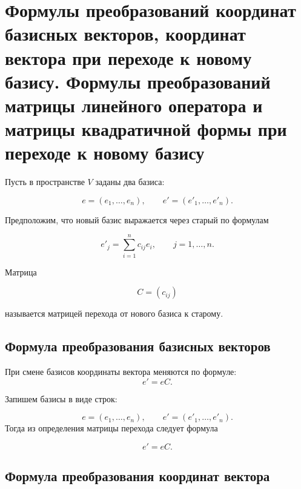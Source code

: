 \documentclass[14pt]{extreport}
\begin{document}
    \chapter{Формулы преобразований координат базисных векторов, координат вектора при переходе к новому базису. Формулы преобразований матрицы линейного оператора и
матрицы квадратичной формы при переходе к новому базису}

\begin{defbox}
    Пусть в пространстве \(V\) заданы два базиса:

\[
e=(e_1,\ldots,e_n),
\qquad
e'=(e'_1,\ldots,e'_n).
\]

Предположим, что новый базис выражается через старый по формулам

\[
e'_j=\sum_{i=1}^{n}c_{ij}e_i,
\qquad j=1,\ldots,n.
\]

Матрица

\[
C=(c_{ij})
\]

называется матрицей перехода от нового базиса к старому.
\end{defbox}
    \section{Формула преобразования базисных векторов}
    \begin{thbox}
        При смене базисов координаты вектора меняются по формуле:
        \[
        e'=eC.
        \]
    \end{thbox}
    \begin{prbox}
        Запишем базисы в виде строк:

        \[
        e=(e_1,\ldots,e_n),
        \qquad
        e'=(e'_1,\ldots,e'_n).
        \]
        Тогда из определения матрицы перехода следует формула

\[
e'=eC.
\]
    \end{prbox}

    \section{Формула преобразования координат вектора}
\end{document}
